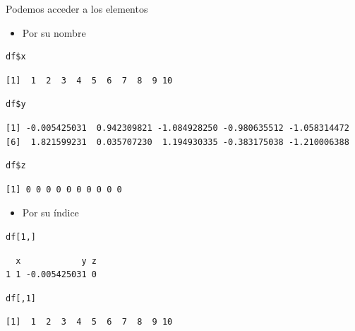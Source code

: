 \documentclass[xcolor={usenames,svgnames,dvipsnames}]{beamer}
\begin{document}
\begin{frame}[fragile,label=sec-3-2-2]{Podemos acceder a los elementos}
 \begin{itemize}
\item Por su nombre
\end{itemize}
\lstset{language=R,label= ,caption= ,numbers=none}
\begin{lstlisting}
df$x
\end{lstlisting}

\begin{verbatim}
[1]  1  2  3  4  5  6  7  8  9 10
\end{verbatim}

\lstset{language=R,label= ,caption= ,numbers=none}
\begin{lstlisting}
df$y
\end{lstlisting}

\begin{verbatim}
[1] -0.005425031  0.942309821 -1.084928250 -0.980635512 -1.058314472
[6]  1.821599231  0.035707230  1.194930335 -0.383175038 -1.210006388
\end{verbatim}

\lstset{language=R,label= ,caption= ,numbers=none}
\begin{lstlisting}
df$z
\end{lstlisting}

\begin{verbatim}
[1] 0 0 0 0 0 0 0 0 0 0
\end{verbatim}

\begin{itemize}
\item Por su índice
\end{itemize}
\lstset{language=R,label= ,caption= ,numbers=none}
\begin{lstlisting}
df[1,]
\end{lstlisting}

\begin{verbatim}
  x            y z
1 1 -0.005425031 0
\end{verbatim}

\lstset{language=R,label= ,caption= ,numbers=none}
\begin{lstlisting}
df[,1]
\end{lstlisting}

\begin{verbatim}
[1]  1  2  3  4  5  6  7  8  9 10
\end{verbatim}
\end{frame}
\end{document}
